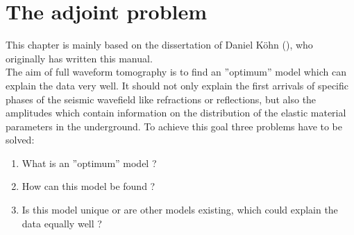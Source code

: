\chapter{The adjoint problem}
This chapter is mainly based on the dissertation of Daniel Köhn (\cite{koehn:11}), who originally has written this manual.\\
\newline
The aim of full waveform tomography is to find an ''optimum'' model which can explain the data very well. It should not only explain the 
first arrivals of specific phases of the seismic wavefield like refractions or reflections, but also the amplitudes which contain information 
on the distribution of the elastic material parameters in the underground. To achieve this goal three problems have to be solved:
\begin{enumerate}
\item What is an ''optimum'' model ?
\item How can this model be found ?
\item Is this model unique or are other models existing, which could explain the data equally well ?   
\end{enumerate}
